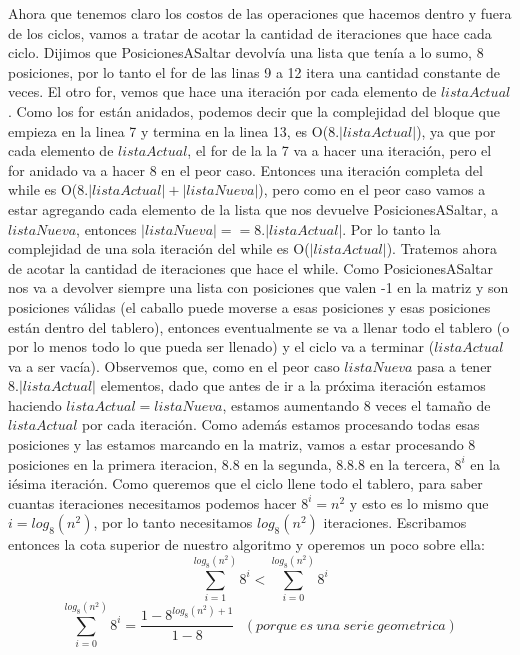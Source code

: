 \documentclass[a4paper]{article}
\begin{document}
\vspace{0.5cm} 
\noindent Ahora que tenemos claro los costos de las operaciones que hacemos dentro y fuera de los ciclos, vamos a tratar de acotar la cantidad de iteraciones que hace cada ciclo.
Dijimos que PosicionesASaltar devolvía una lista que tenía a lo sumo, 8 posiciones, por lo tanto el for de las linas 9 a 12 itera una cantidad constante de veces.
\newline El otro for, vemos que hace una iteración por cada elemento de $listaActual$. Como los for están anidados, podemos decir que la complejidad del bloque que empieza en la linea 7 y termina en la linea 13, es O($8.|listaActual|$), ya que por cada elemento de $listaActual$, el for de la la 7 va a hacer una iteración, pero el for anidado va a hacer 8 en el peor caso. Entonces una iteración completa del while es O($8.|listaActual| + |listaNueva|$), pero como en el peor caso vamos a estar agregando cada elemento de la lista que nos devuelve PosicionesASaltar, a $listaNueva$, entonces $|listaNueva| == 8.|listaActual|$. Por lo tanto la complejidad de una sola iteración del while es O($|listaActual|$).
\newline Tratemos ahora de acotar la cantidad de iteraciones que hace el while. Como PosicionesASaltar nos va a devolver siempre una lista con posiciones que valen -1 en la matriz y son posiciones válidas (el caballo puede moverse a esas posiciones y esas posiciones están dentro del tablero), entonces eventualmente se va a llenar todo el tablero (o por lo menos todo lo que pueda ser llenado) y el ciclo va a terminar ($listaActual$ va a ser vacía). Observemos que, como en el peor caso $listaNueva$ pasa a tener $8.|listaActual|$ elementos, dado que antes de ir a la próxima iteración estamos haciendo $listaActual = listaNueva$, estamos aumentando 8 veces el tamaño de $listaActual$ por cada iteración. Como además estamos procesando todas esas posiciones y las estamos marcando en la matriz, vamos a estar procesando 8 posiciones en la primera iteracion, $8.8$ en la segunda, $8.8.8$ en la tercera, $8^i$ en la iésima iteración. Como queremos que el ciclo llene todo el tablero, para saber cuantas iteraciones necesitamos podemos hacer $8^i = n^2$ y esto es lo mismo que $i = log_8(n^2)$, por lo tanto necesitamos $log_8(n^2)$ iteraciones. Escribamos entonces la cota superior de nuestro algoritmo y operemos un poco sobre ella:
\newline
\[
\sum_{i=1}^{log_8(n^2)}8^i < \sum_{i=0}^{log_8(n^2)}8^i
\]
\[
\sum_{i=0}^{log_8(n^2)}8^i = \frac{1 - 8^{log_8(n^2) + 1}}{1 - 8} \ \ \ (porque \ es \ una \ serie \ geometrica)
\]
\end{document}
